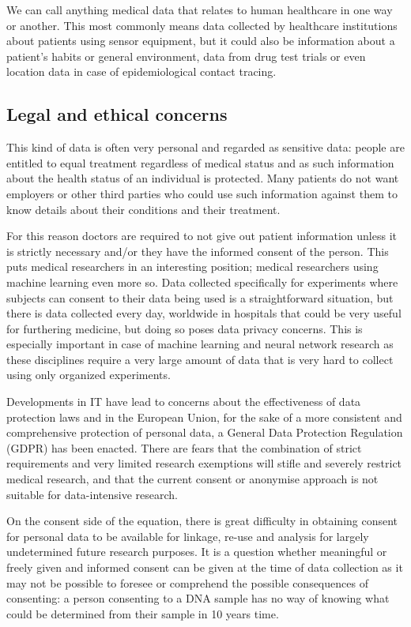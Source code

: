	We can call anything medical data that relates to human healthcare in one way or another. This most commonly means data collected by healthcare institutions about patients using sensor equipment, but it could also be information about a patient's habits or general environment, data from drug test trials or even location data in case of epidemiological contact tracing. 
	
	\subsection{Legal and ethical concerns}
	\label{sec:legal}
	
	This kind of data is often very personal and regarded as sensitive data: people are entitled to equal treatment regardless of medical status and as such information about the health status of an individual is protected. Many patients do not want employers or other third parties who could use such information against them to know details about their conditions and their treatment.
	
	For this reason doctors are required to not give out patient information unless it is strictly necessary and/or they have the informed consent of the person. This puts medical researchers in an interesting position; medical researchers using machine learning even more so. Data collected specifically for experiments where subjects can consent to their data being used is a straightforward situation, but there is data collected every day, worldwide in hospitals that could be very useful for furthering medicine, but doing so poses data privacy concerns. This is especially important in case of machine learning and neural network research as these disciplines require a very large amount of data that is very hard to collect using only organized experiments.
	
	Developments in IT have lead to concerns about the effectiveness of data protection laws and in the European Union, for the sake of a more consistent and comprehensive protection of personal data, a General Data Protection Regulation (GDPR) has been enacted\cite{GDPR2016a}. There are fears that the combination of strict requirements and very limited research exemptions will stifle and severely restrict medical research, and that the current consent or anonymise approach is not suitable for data-intensive research\cite{mostert2016big}. 
	
	On the consent side of the equation, there is great difficulty in obtaining consent for personal data to be available for linkage, re-use and analysis for largely undetermined future research purposes\cite{anderson2015collection}. It is a question whether meaningful or freely given and informed consent can be given at the time of data collection as it may not be possible to foresee or comprehend the possible consequences of consenting: a person consenting to a DNA sample has no way of knowing what could be determined from their sample in 10 years time.
	
